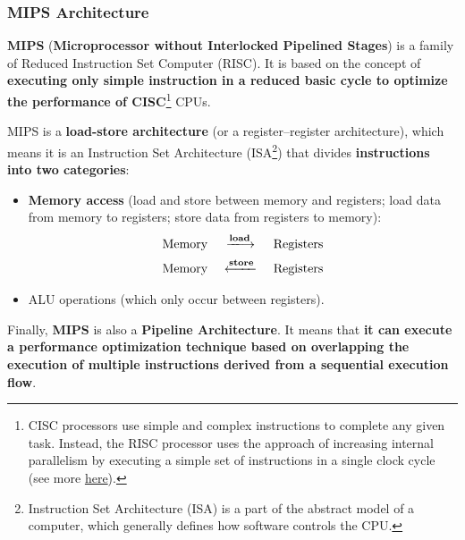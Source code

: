 \documentclass[a4paper]{article}
\newcommand{\definition}[1]{\textcolor{Red3}{\textbf{#1}}\index{#1}}
\newcommand{\highspace}{\vspace{1.2em}\noindent}
\begin{document}
    \subsubsection{MIPS  Architecture}

    \definition{MIPS} (\textbf{Microprocessor without Interlocked Pipelined Stages}) is a family of Reduced Instruction Set Computer (RISC). It is based on the concept of \textbf{executing only simple instruction in a reduced basic cycle to optimize the performance of CISC}\footnote{CISC processors use simple and complex instructions to complete any given task. Instead, the RISC processor uses the approach of increasing internal parallelism by executing a simple set of instructions in a single clock cycle (see more \href{https://electronicsdesk.com/cisc-processor.html}{here}).} CPUs.

    \highspace
    MIPS is a \textbf{load-store architecture} (or a register–register architecture), which means it is an Instruction Set Architecture (ISA\footnote{Instruction Set Architecture (ISA) is a part of the abstract model of a computer, which generally defines how software controls the CPU.}) that divides \textbf{instructions into two categories}: 
    \begin{itemize}
        \item \textbf{Memory access} (load and store between memory and registers; load data from memory to registers; store data from registers to memory):
        \begin{equation*}
            \begin{array}{rcl}
                \text{Memory } &\xlongrightarrow{\mathbf{load}}& \text{ Registers} \\ [.5em]
                \text{Memory } &\xlongleftarrow{\mathbf{store}}& \text{ Registers}
            \end{array}
        \end{equation*}
        \item ALU operations (which only occur between registers).
    \end{itemize}

    \highspace
    Finally, \textbf{MIPS} is also a \textbf{Pipeline Architecture}. It means that \textbf{it can execute a performance optimization technique based on overlapping the execution of multiple instructions derived from a sequential execution flow}.

    \newpage
\end{document}
